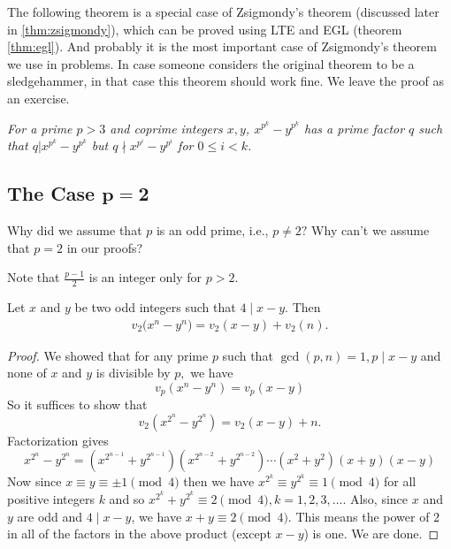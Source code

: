 \documentclass[main.tex]{subfile}
\begin{document}
    The following theorem is a  special case of Zsigmondy's theorem (discussed later in \eqref{thm:zsigmondy}), which can be proved using LTE and EGL (theorem \eqref{thm:egl}). And probably it is the most important case of Zsigmondy's theorem  we use in problems. In case someone considers the original theorem to be a sledgehammer, in that case this theorem should work fine. We leave the proof as an exercise.
    
    \begin{theorem}\slshape
    	For a prime $p>3$ and coprime integers $x,y$, $x^{p^k}-y^{p^k}$ has a prime factor $q$ such that $q|x^{p^k}-y^{p^k}$ but $q\nmid x^{p^i}-y^{p^i}$ for $0\le i<k$.
    \end{theorem}
    

\subsection{The Case \texorpdfstring{$\boldsymbol{p=2}$}{p = 2}}

    \begin{question}
        Why did we assume that $p$ is an odd prime, i.e., $p \neq 2 ?$ Why can't we assume that $p=2$ in our proofs?
    \end{question}
    
    \begin{hint}
        Note that $\frac{p-1}{2}$ is an integer only for $p>2.$
    \end{hint}
    
    
    \begin{theorem}[LTE for $p = 2$]
        Let $x$ and $y$ be two odd integers such that $4 \mid x-y.$ Then
         \begin{align*}
         v_2  \big(x^n - y^n \big) = v_2  (x-y ) + v_2  (n ).
         \end{align*}
    \end{theorem}

    \begin{proof}
        We showed that for any prime $p$ such that $\gcd(p,n)=1, p \mid x-y$ and  none of $x$ and $y$ is divisible by $p,$ we have
            \[v_p(  x^n - y^n ) = v_p(  x - y )\]
        So it suffices to show that
            \[v_2(  x^{2^{n}} - y^{2^{n}} ) = v_2(  x-y ) + n.\]
        Factorization gives
            \[x^{2^{n}} - y^{2^{n}} = (x^{2^{n-1}} + y^{2^{n-1}})(x^{2^{n-2}} + y^{2^{n-2}}) \cdots (x^2 + y^2 )(x + y)(x - y) \]
        Now since $x \equiv y \equiv \pm 1\pmod 4$ then we have $x^{2^{k}}  \equiv  y^{2^{k}} \equiv 1 \pmod 4$ for all positive integers $k$ and so $x^{2^{k}} + y^{2^{k}} \equiv 2 \pmod 4, k=1,2,3,\ldots.$ Also, since $x$ and $y$ are odd and $4\mid x-y$, we have $x+y \equiv 2\pmod 4$.
        This means the power of $2$ in all of the factors in the above product (except $x-y$) is one. We are done.
    \end{proof}
\end{document}
